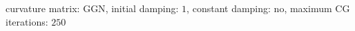 curvature matrix: $\text{GGN}$, initial damping: $\num[scientific-notation=false]{1}$, constant damping: $\text{no}$, maximum CG iterations: $\num[scientific-notation=false]{250}$